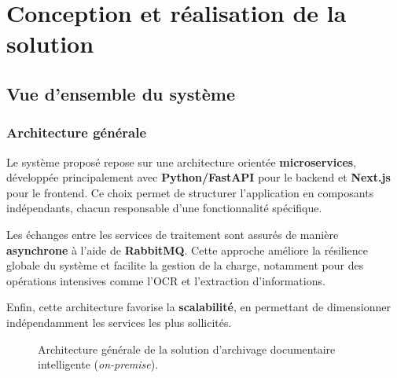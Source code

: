 \documentclass[12pt,a4paper]{report}
\begin{document}
\part{Conception et réalisation de la solution}

\chapter{Vue d’ensemble du système}
\section{Architecture générale}
Le système proposé repose sur une architecture orientée \textbf{microservices}, développée principalement avec \textbf{Python/FastAPI} pour le backend et \textbf{Next.js} pour le frontend. Ce choix permet de structurer l’application en composants indépendants, chacun responsable d’une fonctionnalité spécifique.

Les échanges entre les services de traitement sont assurés de manière \textbf{asynchrone} à l’aide de \textbf{RabbitMQ}. Cette approche améliore la résilience globale du système et facilite la gestion de la charge, notamment pour des opérations intensives comme l’OCR et l’extraction d’informations.

Enfin, cette architecture favorise la \textbf{scalabilité}, en permettant de dimensionner indépendamment les services les plus sollicités.

\begin{figure}[h!]
\centering

\caption{Architecture générale de la solution d’archivage documentaire intelligente (\textit{on-premise}).}
\label{fig:archi-generale}
\end{figure}
\end{document}
